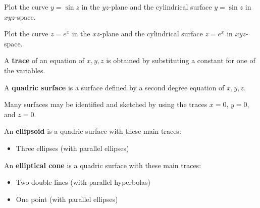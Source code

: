 \documentclass[letterpaper, twoside, 12pt]{book}
\begin{document}
          \begin{problem}
            Plot the curve $y=\sin z$ in the $yz$-plane and the
            cylindrical surface $y=\sin z$ in $xyz$-space.
          \end{problem}

          \begin{solution}

          \end{solution}

          \begin{problem}
            Plot the curve $z=e^x$ in the $xz$-plane and the
            cylindrical surface $z=e^x$ in $xyz$-space.
          \end{problem}

          \begin{solution}

          \end{solution}

\begin{definition}
  A \textbf{trace} of an equation of $x,y,z$ is obtained by substituting
  a constant for one of the variables.
\end{definition}

\begin{definition}
  A \textbf{quadric surface} is a surface defined by a second
  degree equation of $x,y,z$.
\end{definition}

\begin{remark}
  Many surfaces may be identified and sketched by using the traces
  $x=0$, $y=0$, and $z=0$.
\end{remark}

\begin{definition}
  An \textbf{ellipsoid} is a quadric surface with these main traces:
    \begin{itemize}
    \item Three ellipses (with parallel ellipses)
    \end{itemize}
\end{definition}

\begin{definition}
  An \textbf{elliptical cone} is a quadric surface with these main traces:
    \begin{itemize}
    \item Two double-lines (with parallel hyperbolas)
    \item One point (with parallel ellipses)
    \end{itemize}
\end{definition}
\end{document}
